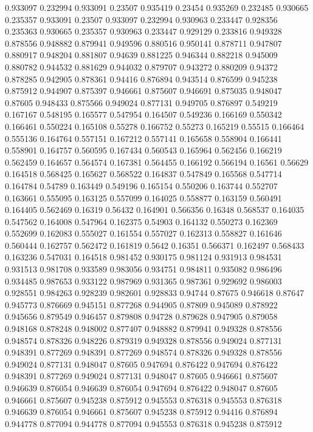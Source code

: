 0.933097 0.232994
0.933091 0.23507
0.935419 0.23454
0.935269 0.232485
0.930665 0.235357
0.933091 0.23507
0.933097 0.232994
0.930963 0.233447
0.928356 0.235363
0.930665 0.235357
0.930963 0.233447
0.929129 0.233816
0.949328 0.878556
0.948882 0.879941
0.949596 0.880516
0.950141 0.878711
0.947807 0.880917
0.948204 0.881807
0.94639 0.881225
0.946344 0.882218
0.945009 0.880782
0.944532 0.881629
0.944032 0.879707
0.943272 0.880209
0.94372 0.878285
0.942905 0.878361
0.94416 0.876894
0.943514 0.876599
0.945238 0.875912
0.944907 0.875397
0.946661 0.875607
0.946691 0.875035
0.948047 0.87605
0.948433 0.875566
0.949024 0.877131
0.949705 0.876897
0.549219 0.167167
0.548195 0.165577
0.547954 0.164507
0.549236 0.166169
0.550342 0.166461
0.550224 0.165108
0.55278 0.166752
0.55273 0.165219
0.55515 0.166464
0.555136 0.164764
0.557151 0.167212
0.557141 0.165658
0.558904 0.166441
0.558901 0.164757
0.560595 0.167434
0.560543 0.165964
0.562456 0.166219
0.562459 0.164657
0.564574 0.167381
0.564455 0.166192
0.566194 0.16561
0.56629 0.164518
0.568425 0.165627
0.568522 0.164837
0.547849 0.165568
0.547714 0.164784
0.54789 0.163449
0.549196 0.165154
0.550206 0.163744
0.552707 0.163661
0.555095 0.163125
0.557099 0.164025
0.558877 0.163159
0.560491 0.164405
0.562469 0.16319
0.56432 0.164901
0.566356 0.16348
0.568537 0.164035
0.547562 0.164008
0.547964 0.162375
0.54903 0.164132
0.550273 0.162369
0.552699 0.162083
0.555027 0.161554
0.557027 0.162313
0.558827 0.161646
0.560444 0.162757
0.562472 0.161819
0.5642 0.16351
0.566371 0.162497
0.568433 0.163236
0.547031 0.164518
0.981452 0.930175
0.981124 0.931913
0.984531 0.931513
0.981708 0.933589
0.983056 0.934751
0.984811 0.935082
0.986496 0.934485
0.987653 0.933122
0.987969 0.931365
0.987361 0.929692
0.986003 0.928551
0.984263 0.928239
0.982601 0.928833
0.94744 0.87675
0.946618 0.87647
0.945773 0.876669
0.945151 0.877268
0.944905 0.87809
0.945089 0.878922
0.945656 0.879549
0.946457 0.879808
0.94728 0.879628
0.947905 0.879058
0.948168 0.878248
0.948002 0.877407
0.948882 0.879941
0.949328 0.878556
0.948574 0.878326
0.948226 0.879319
0.949328 0.878556
0.949024 0.877131
0.948391 0.877269
0.948391 0.877269
0.948574 0.878326
0.949328 0.878556
0.949024 0.877131
0.948047 0.87605
0.947694 0.876422
0.947694 0.876422
0.948391 0.877269
0.949024 0.877131
0.948047 0.87605
0.946661 0.875607
0.946639 0.876054
0.946639 0.876054
0.947694 0.876422
0.948047 0.87605
0.946661 0.875607
0.945238 0.875912
0.945553 0.876318
0.945553 0.876318
0.946639 0.876054
0.946661 0.875607
0.945238 0.875912
0.94416 0.876894
0.944778 0.877094
0.944778 0.877094
0.945553 0.876318
0.945238 0.875912
